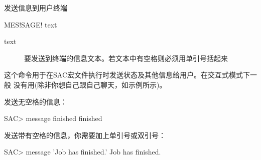 \label{cmd:message}

发送信息到用户终端

\begin{SACSTX}
MES!SAGE! text
\end{SACSTX}

\begin{description}
\item [text] 要发送到终端的信息文本。若文本中有空格则必须用单引号括起来
\end{description}

这个命令用于在SAC宏文件执行时发送状态及其他信息给用户。在交互式模式下一般
没有用(除非你想自己跟自己聊天，如示例所示)。

发送无空格的信息：
\begin{SACCode}
SAC> message finished
 finished
\end{SACCode}

发送带有空格的信息，你需要加上单引号或双引号：
\begin{SACCode}
SAC> message 'Job has finished.'
 Job has finished.
\end{SACCode}
